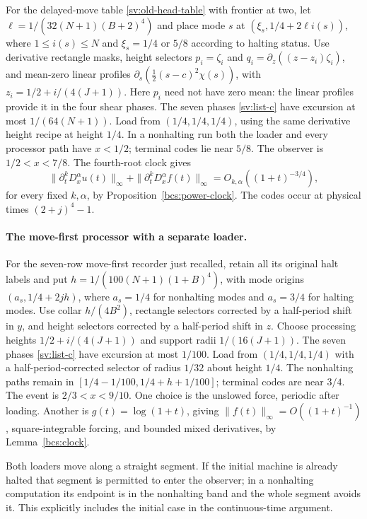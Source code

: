 For the delayed-move table \eqref{sv:old-head-table} with frontier at
two, let $\ell=1/(32(N+1)(B+2)^4)$ and place mode $s$ at
$(\xi_s,1/4+2\ell i(s))$, where $1\le i(s)\le N$ and
$\xi_s=1/4$ or $5/8$ according to halting status.  Use derivative
rectangle masks, height selectors $p_i=\zeta_i$ and
$q_i=\partial_z((z-z_i)\zeta_i)$, and mean-zero linear profiles
$\partial_s(\tfrac12(s-c)^2\chi(s))$, with
$z_i=1/2+i/(4(J+1))$.  Here $p_i$ need not have zero mean:
the linear profiles provide it in the four shear phases.  The seven
phases \eqref{sv:list-c} have excursion at most $1/(64(N+1))$.
Load from $(1/4,1/4,1/4)$, using the same derivative height recipe
at height $1/4$.  In a nonhalting run both the loader and every
processor path have $x<1/2$; terminal codes lie near $5/8$.
The observer is $1/2<x<7/8$.  The fourth-root clock gives
\[
 \|\partial_t^kD_x^\alpha u(t)\|_\infty+
 \|\partial_t^kD_x^\alpha f(t)\|_\infty
 =O_{k,\alpha}((1+t)^{-3/4}),
\]
for every fixed $k,\alpha$, by Proposition~\ref{bcs:power-clock}.
The codes occur at physical times $(2+j)^4-1$.



\paragraph{The move-first processor with a separate loader.}
For the seven-row move-first recorder just recalled,
retain all its original halt labels and put
$h=1/(100(N+1)(1+B)^4)$, with mode origins
$(a_s,1/4+2jh)$, where $a_s=1/4$ for nonhalting modes and
$a_s=3/4$ for halting modes.  Use collar $h/(4B^2)$, rectangle
selectors corrected by a half-period shift in $y$, and height selectors
corrected by a half-period shift in $z$.  Choose processing heights
$1/2+i/(4(J+1))$ and support radii $1/(16(J+1))$.
The seven phases \eqref{sv:list-c} have excursion at most $1/100$.
Load from $(1/4,1/4,1/4)$ with a half-period-corrected selector
of radius $1/32$ about height $1/4$.  The nonhalting paths remain
in $[1/4-1/100,1/4+h+1/100]$; terminal codes are near $3/4$.
The event is $2/3<x<9/10$.  One choice is the unslowed force,
periodic after loading.  Another is $g(t)=\log(1+t)$, giving
$\|f(t)\|_\infty=O((1+t)^{-1})$, square-integrable forcing,
and bounded mixed derivatives, by Lemma~\ref{bcs:clock}.

Both loaders move along a straight segment.  If the initial machine is
already halted that segment is permitted to enter the observer; in a
nonhalting computation its endpoint is in the nonhalting band and the
whole segment avoids it.  This explicitly includes the initial case in
the continuous-time argument.

